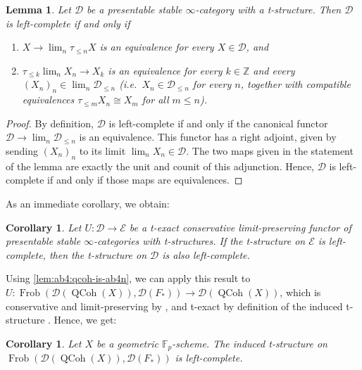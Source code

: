 \documentclass{article}
\theoremstyle{definition}
\theoremstyle{definition}
\theoremstyle{definition}
\theoremstyle{plain}
\newtheorem{lem}[defn]{Lemma}
\theoremstyle{plain}
\theoremstyle{plain}
\newtheorem{cor}[defn]{Corollary}
\theoremstyle{plain}
\theoremstyle{plain}
\theoremstyle{plain}
\theoremstyle{plain}
\theoremstyle{plain}
\theoremstyle{remark}
\theoremstyle{remark}
\theoremstyle{plain}
\theoremstyle{plain}
\theoremstyle{plain}
\theoremstyle{plain}
\theoremstyle{plain}
\newcommand{\Z}{\mathbb{Z}}
\newcommand{\Fp}{\mathbb{F}_p}
\renewcommand{\lim}{\operatorname{lim}}
\newcommand{\QCoh}[1]{\operatorname{QCoh}(#1)}
\newcommand{\Frob}[2]{\operatorname{Frob}(#1, #2)}
\newcommand{\Cat}[1]{\mathcal{#1}}
\begin{document}
\begin{lem}
    Let $\Cat D$ be a presentable stable $\infty$-category with a t-structure.
    Then $\Cat D$ is left-complete if and only if 
    \begin{enumerate}[label=(\alph*)]
        \item $X \to \lim_n \tau_{\le n} X$ is an equivalence for every $X \in \Cat D$, and
        \item $\tau_{\le k} \lim_n X_n \to X_k$ is an equivalence for every $k \in \Z$ and every 
            $(X_n)_n \in \lim_n \Cat D_{\le n}$ (i.e.\ $X_n \in \Cat D_{\le n}$ for every $n$,
            together with compatible equivalences $\tau_{\le m} X_n \cong X_m$ for all $m \le n$).
    \end{enumerate}
\end{lem}
\begin{proof}
    By definition, $\Cat D$ is left-complete if and only if the canonical functor 
    $\Cat D \to \lim_n \Cat D_{\le n}$ is an equivalence.
    This functor has a right adjoint, given by sending $(X_n)_n$ to its limit $\lim_n X_n \in \Cat D$.
    The two maps given in the statement of the lemma are exactly the unit and counit of this adjunction.
    Hence, $\Cat D$ is left-complete if and only if those maps are equivalences.
\end{proof}

As an immediate corollary, we obtain:
\begin{cor} \label{lem:ab4:conservative-limit-preserving-reflects-left-complete}
    Let $U \colon \Cat D \to \Cat E$ be a t-exact conservative limit-preserving functor 
    of presentable stable $\infty$-categories with t-structures.
    If the t-structure on $\Cat E$ is left-complete, then the t-structure on $\Cat D$ is also left-complete.
\end{cor}

Using \cref{lem:ab4:qcoh-is-ab4n}, we can apply this result to $U \colon \Frob{\Cat D(\QCoh{X})}{\Cat D(F_*)} \to \Cat D(\QCoh{X})$, 
which is conservative and limit-preserving by \cite[Corollary 2.8 (b) and (c)]{cartmod},
and t-exact by definition of the induced t-structure \cite[Proposition 3.3]{cartmod}.
Hence, we get:

\begin{cor} \label{lem:ab4:frobD-is-left-complete}
    Let $X$ be a geometric $\Fp$-scheme. 
    The induced t-structure on $\Frob{\Cat D(\QCoh{X})}{\Cat D(F_*)}$ 
    is left-complete.
\end{cor}
\end{document}

